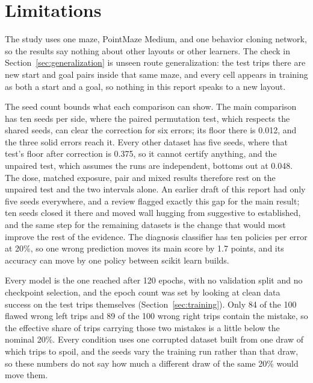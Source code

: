 \documentclass[conference]{IEEEtran}
\begin{document}
\FloatBarrier
\section{Limitations}\label{sec:limitations}

The study uses one maze, PointMaze Medium, and one behavior cloning network, so the results say nothing about
other layouts or other learners. The check in Section~\ref{sec:generalization} is unseen route generalization:
the test trips there are new start and goal pairs inside that same maze, and every cell appears in training as
both a start and a goal, so nothing in this report speaks to a new layout.

The seed count bounds what each comparison can show. The main comparison has ten seeds per side, where the
paired permutation test, which respects the shared seeds, can clear the correction for six errors; its floor
there is 0.012, and the three solid errors reach it. Every other dataset has five seeds, where that test's floor
after correction is 0.375, so it cannot certify anything, and the unpaired test, which assumes the runs are
independent, bottoms out at 0.048. The dose, matched exposure, pair and mixed results therefore rest on the
unpaired test and the two intervals alone. An earlier draft of this report had only five seeds everywhere, and a
review flagged exactly this gap for the main result; ten seeds closed it there and moved wall hugging from
suggestive to established, and the same step for the remaining datasets is the change that would most improve
the rest of the evidence. The diagnosis classifier has ten policies per error at 20\%, so one wrong prediction
moves its main score by 1.7 points, and its accuracy can move by one policy between scikit learn builds.

Every model is the one reached after 120 epochs, with no validation split and no checkpoint selection, and the
epoch count was set by looking at clean data success on the test trips themselves
(Section~\ref{sec:training}). Only 84 of the 100 flawed wrong left trips and 89 of the 100 wrong right trips
contain the mistake, so the effective share of trips carrying those two mistakes is a little below the nominal
20\%. Every condition uses one corrupted dataset built from one draw of which trips to spoil, and the seeds vary
the training run rather than that draw, so these numbers do not say how much a different draw of the same
20\% would move them.
\end{document}
